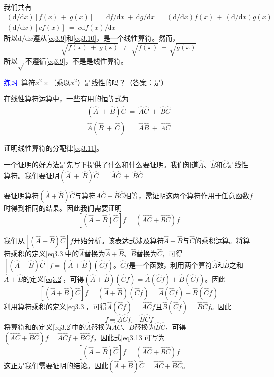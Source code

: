 \documentclass[12pt,a4paper,openany]{ctexbook}
\begin{document}
\begin{flushleft}
\begin{examplebox}
我们共有
\begin{gather*}
    (\mathrm{d}/\mathrm{d}x)[f(x)\ +\ g(x)]\ =\ \mathrm{d}f/\mathrm{d}x\ +\ \mathrm{d}g/\mathrm{d}x\ =\ (\mathrm{d}/\mathrm{d}x)f(x)\ +\ (\mathrm{d}/\mathrm{d}x)g(x) \\
    (\mathrm{d}/\mathrm{d}x)[cf(x)]\ =\ c\mathrm{d}f(x)/\mathrm{d}x
\end{gather*}
所以$\mathrm{d}/\mathrm{d}x$遵从\eqref{eq3.9}和\eqref{eq3.10}，是一个线性算符。然而，
\begin{equation*}
    \sqrt{f(x)\ +\ g(x)}\ \neq\ \sqrt{f(x)}\ +\ \sqrt{g(x)}
\end{equation*}
所以$\sqrt{}$不遵循\eqref{eq3.9}，不是是线性算符。

\textcolor{blue}{\large 练习}\ 算符$x^2\times$（乘以$x^2$）是线性的吗？（答案：是）
\end{examplebox}

在线性算符运算中，一些有用的恒等式为
\begin{align}
    \boxed{(\hat{A}\ +\ \hat{B})\hat{C}\ =\ \hat{A}\hat{C}\ +\ \hat{B}\hat{C}} \label{eq3.11} \\
    \boxed{\hat{A}(\hat{B}\ +\ \hat{C})\ =\ \hat{A}\hat{B}\ +\ \hat{A}\hat{C}} \label{eq3.12} 
\end{align}

\begin{examplebox}
    \setlength{\parindent}{2em}
证明线性算符的分配律\eqref{eq3.11}。

一个证明的好方法是先写下提供了什么和什么要证明。我们知道$\hat{A}$、$\hat{B}$和$\hat{C}$是线性算符。我们要证明$(\hat{A}\ +\ \hat{B})\hat{C}\ =\ \hat{A}\hat{C}\ +\ \hat{B}\hat{C}$

要证明算符$(\hat{A} + \hat{B})\hat{C}$与算符$\hat{A}\hat{C} + \hat{B}\hat{C}$相等，需证明这两个算符作用于任意函数$f$时得到相同的结果。因此我们需要证明
\[
[(\hat{A} + \hat{B})\hat{C}]f = (\hat{A}\hat{C} + \hat{B}\hat{C})f
\]

我们从$[(\hat{A} + \hat{B})\hat{C}]f$开始分析。该表达式涉及算符$\hat{A} + \hat{B}$与$\hat{C}$的乘积运算。将算符乘积的定义\eqref{eq3.3}中的$\hat{A}$替换为$\hat{A} + \hat{B}$、$\hat{B}$替换为$\hat{C}$，可得$[(\hat{A} + \hat{B})\hat{C}]f = (\hat{A} + \hat{B})(\hat{C}f)$。$\hat{C}f$是一个函数，利用两个算符$\hat{A}$和$\hat{B}$之和$\hat{A} + \hat{B}$的定义\eqref{eq3.2}，可得$(\hat{A} + \hat{B})(\hat{C}f) = \hat{A}(\hat{C}f) + \hat{B}(\hat{C}f)$。因此
\[
[(\hat{A} + \hat{B})\hat{C}]f = (\hat{A} + \hat{B})(\hat{C}f) = \hat{A}(\hat{C}f) + \hat{B}(\hat{C}f)
\]
利用算符乘积的定义\eqref{eq3.3}，可得$\hat{A}(\hat{C}f) = \hat{A}\hat{C}f$且$\hat{B}(\hat{C}f) = \hat{B}\hat{C}f$。因此
\begin{equation}
    [(\hat{A} + \hat{B})\hat{C}]f = \hat{A}\hat{C}f + \hat{B}\hat{C}f
    \label{eq3.13}
\end{equation}
将算符和的定义\eqref{eq3.2}中的$\hat{A}$替换为$\hat{A}\hat{C}$、$\hat{B}$替换为$\hat{B}\hat{C}$，可得$(\hat{A}\hat{C} + \hat{B}\hat{C})f = \hat{A}\hat{C}f + \hat{B}\hat{C}f$，因此式\eqref{eq3.13}可写为
\[
[(\hat{A} + \hat{B})\hat{C}]f = (\hat{A}\hat{C} + \hat{B}\hat{C})f
\]
这正是我们需要证明的结论。因此$(\hat{A} + \hat{B})\hat{C} = \hat{A}\hat{C} + \hat{B}\hat{C}$。


\end{examplebox}
\end{flushleft}
\end{document}
